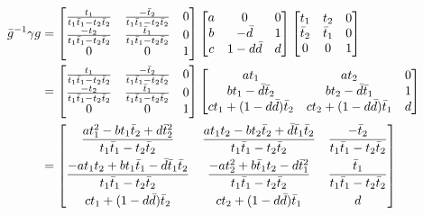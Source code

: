 \begin{align*}
  \bar g ^{-1} \gamma g
  &=
  \begin{bmatrix}
  \frac{t_1}{t_1 \bar t_1 - t_2 \bar t_2} & \frac{-\bar t_2}{t_1 \bar t_1 - t_2 \bar t_2} & 0 \\
  \frac{-t_2}{t_1 \bar t_1 - t_2 \bar t_2} & \frac{\bar t_1}{t_1 \bar t_1 - t_2 \bar t_2} & 0 \\
  0 & 0 & 1 \end{bmatrix}
  \begin{bmatrix}
    a & 0 & 0 \\
    b & - \bar d & 1 \\
    c & 1 - d \bar d & d
  \end{bmatrix}
  \begin{bmatrix}
  t_1 & t_2 & 0  \\
  \bar t_2 & \bar t_1 & 0 \\
  0 & 0 & 1
  \end{bmatrix} \\
  &=
  \begin{bmatrix}
  \frac{t_1}{t_1 \bar t_1 - t_2 \bar t_2} & \frac{-\bar t_2}{t_1 \bar t_1 - t_2 \bar t_2} & 0 \\
  \frac{-t_2}{t_1 \bar t_1 - t_2 \bar t_2} & \frac{\bar t_1}{t_1 \bar t_1 - t_2 \bar t_2} & 0 \\
  0 & 0 & 1 \end{bmatrix}
  \begin{bmatrix}
    at_1 & at_2 & 0 \\
    bt_1 - \bar d \bar t_2 & b t_2 - \bar d \bar t_1 & 1 \\
    ct_1 + (1-d\bar d)\bar t_2 & ct_2 + (1-d \bar d) \bar t_1 & d
  \end{bmatrix}
  \\
  &=
  \begin{bmatrix}
    \dfrac{at_1^2 - bt_1 \bar t_2 + d \bar t_2^2}{t_1 \bar t_1 - t_2 \bar t_2}
    & \dfrac{at_1t_2 - bt_2 \bar t_2 + \bar d \bar t_1 \bar t_2}{t_1 \bar t_1 - t_2 \bar t_2}
    & \dfrac{-\bar t_2}{t_1 \bar t_1 - t_2 \bar t_2} \\[2ex]
    \dfrac{-at_1t_2+bt_1\bar t_1-\bar d \bar t_1 \bar t_2}{t_1 \bar t_1 - t_2 \bar t_2}
    & \dfrac{-at_2^2+b\bar t_1 t_2-d\bar t_1^2}{t_1 \bar t_1 - t_2 \bar t_2}
    & \dfrac{\bar t_1}{t_1 \bar t_1 - t_2 \bar t_2} \\[2ex]
    ct_1 + (1-d\bar d)\bar t_2 & ct_2 + (1-d \bar d) \bar t_1 & d
  \end{bmatrix}
\end{align*}
